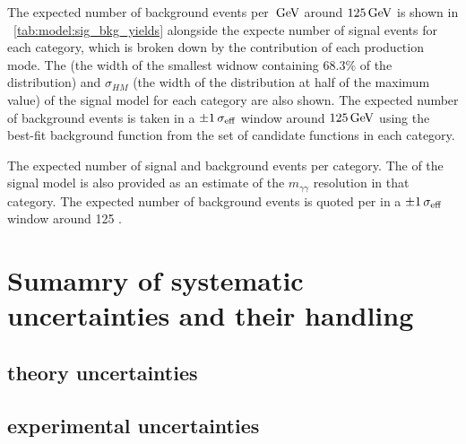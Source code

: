 The expected number of background events per $\,\text{Ge\hspace{-.08em}V}$ around $125\,\text{Ge\hspace{-.08em}V}$ is shown in \Table~\ref{tab:model:sig_bkg_yields} alongside the expecte number of signal events for each category, which is broken down by the contribution of each production mode. The \effSigma (the width of the smallest widnow containing $68.3\%$ of the distribution) and $\sigma_{HM}$ (the width of the distribution at half of the maximum value) of the signal model for each category are also shown. The expected number of background events is taken in a $\pm 1 \,\sigma_{\text{eff}}$ window around $125\,\text{Ge\hspace{-.08em}V}$ using the best-fit background function from the set of candidate functions in each category.

 \begin{table}
  \resizebox{\textwidth}{!}{

}
 \caption{ The expected number of signal and background events per category. The \effSigma of the signal model is also provided as an estimate of the $m_{\gamma\gamma}$ resolution in that category. The expected number of background events is quoted per \GeV in a $\pm 1 \,\sigma_{\text{eff}}$ window around 125 \GeV.}
 \label{tab:model:sig_bkg_yields}
\end{table}

\section{Sumamry of systematic uncertainties and their handling}

\subsection{theory uncertainties}
\subsection{experimental uncertainties}

